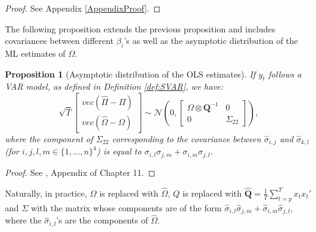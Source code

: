 \documentclass[
  12pt,
]{book}
\newtheorem{proposition}{Proposition}[chapter]
\theoremstyle{definition}
\theoremstyle{definition}
\theoremstyle{definition}
\theoremstyle{definition}
\theoremstyle{remark}
\begin{document}
\begin{proof}
See Appendix \ref{AppendixProof}.
\end{proof}

The following proposition extends the previous proposition and includes covariances between different \(\beta_i\)'s as well as the asymptotic distribution of the ML estimates of \(\Omega\).

\begin{proposition}[Asymptotic distribution of the OLS estimates]
\protect\hypertarget{prp:OLSVAR2}{}\label{prp:OLSVAR2}If \(y_t\) follows a VAR model, as defined in Definition \ref{def:SVAR}, we have:
\begin{equation}
\sqrt{T}\left[
\begin{array}{c}
vec(\hat\Pi - \Pi)\\
vec(\hat\Omega - \Omega)
\end{array}
\right]
\sim \mathcal{N}\left(0,
\left[
\begin{array}{cc}
\Omega \otimes \mathbf{Q}^{-1} & 0\\
0 & \Sigma_{22}
\end{array}
\right]\right),\label{eq:asymptPi}
\end{equation}
where the component of \(\Sigma_{22}\) corresponding to the covariance between \(\hat\sigma_{i,j}\) and \(\hat\sigma_{k,l}\) (for \(i,j,l,m \in \{1,\dots,n\}^4\)) is equal to \(\sigma_{i,l}\sigma_{j,m}+\sigma_{i,m}\sigma_{j,l}\).
\end{proposition}

\begin{proof}
See \citet{Hamilton_1994}, Appendix of Chapter 11.
\end{proof}

Naturally, in practice, \(\Omega\) is replaced with \(\hat{\Omega}\), \(Q\) is replaced with \(\hat{\mathbf{Q}} = \frac{1}{T}\sum_{t=p}^T x_t x_t'\) and \(\Sigma\) with the matrix whose components are of the form \(\hat\sigma_{i,l}\hat\sigma_{j,m}+\hat\sigma_{i,m}\hat\sigma_{j,l}\), where the \(\hat\sigma_{i,l}\)'s are the components of \(\hat\Omega\).
\end{document}
